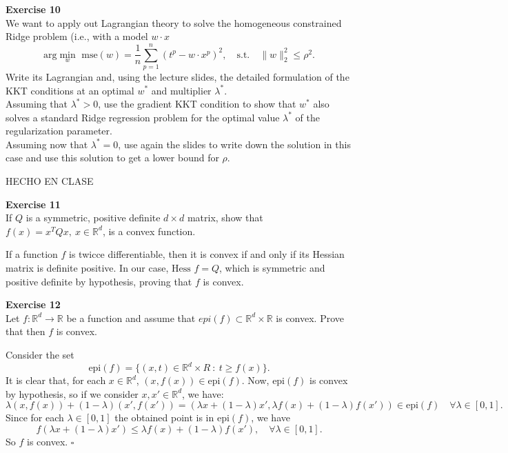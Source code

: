 \documentclass[11pt,table]{article}
\newcommand{\qed}{\hfill $\square$}
\newenvironment{problem}[2][Exercise]
{ \begin{mdframed}[backgroundcolor=gray!20] \textbf{#1 #2} \\}
	{  \end{mdframed}}
\newcommand\norm[1]{\lVert#1\rVert}
\newcommand\R{\mathbb R}
\begin{document}
\begin{problem}{10}
We want to apply out Lagrangian theory to solve the homogeneous constrained Ridge problem (i.e., with a model \(w\cdot x\)
\[
	\text{arg}\min_{w} \text{ mse}(w) = \frac{1}{n} \sum_{p=1}^n (t^p - w \cdot x^p)^2, \quad \text{s.t.} \quad \norm{w}_2^2 \leq \rho^2.
\]
Write its Lagrangian and, using the lecture slides, the detailed formulation of the KKT conditions at an optimal \(w^*\) and multiplier \(\lambda^*\).\\
Assuming that \(\lambda^* > 0\), use the gradient KKT condition to show that \(w^*\) also solves a standard Ridge regression problem for the optimal value \(\lambda^*\) of the regularization parameter.\\
Assuming now that \(\lambda^* = 0\), use again the slides to write down the solution in this case and use this solution to get a lower bound for \(\rho\).
\end{problem}

HECHO EN CLASE

\begin{problem}{11}
If \( Q \) is a symmetric, positive definite \( d \times d \) matrix, show that \( f(x) = x^TQx, \ x \in \mathbb{R}^d \), is a convex function.
\end{problem}

If a function $f$ is twicce differentiable, then it is convex if and only if its Hessian matrix is definite positive. In our case, $\text{Hess }f = Q$, which is symmetric and positive definite by hypothesis, proving that $f$ is convex. \\

\begin{problem}{12}
Let \( f:\mathbb{R}^d \to \mathbb{R} \)  be a function and assume that \( epi(f) \subset \mathbb{R}^d \times \mathbb{R} \)  is convex. Prove that then \( f \)  is convex.

\end{problem}

Consider the set
\[
	\text{epi}(f) = \{(x,t)\in \R^d \times R \ : \ t \geq f(x)\}.
\]
It is clear that, for each \(x \in \R^d\), \((x,f(x))\in \text{epi}(f)\). Now, \(\text{epi}(f)\) is convex by hypothesis, so if we consider \(x,x'\in \R^d\), we have:
\[
	\lambda(x,f(x)) + (1-\lambda)(x',f(x')) = \left(\lambda x + (1-\lambda)x', \lambda f(x) + (1-\lambda)f(x')\right) \in \text{epi}(f)\quad \forall \lambda \in [0,1].
\]
Since for each \(\lambda \in [0,1]\) the obtained point is in \(\text{epi}(f)\), we have
\[
	f(\lambda x + (1-\lambda)x') \leq \lambda f(x) + (1-\lambda)f(x'), \quad \forall \lambda \in [0,1].
\]
So \(f\) is convex. \qed \\
\end{document}
